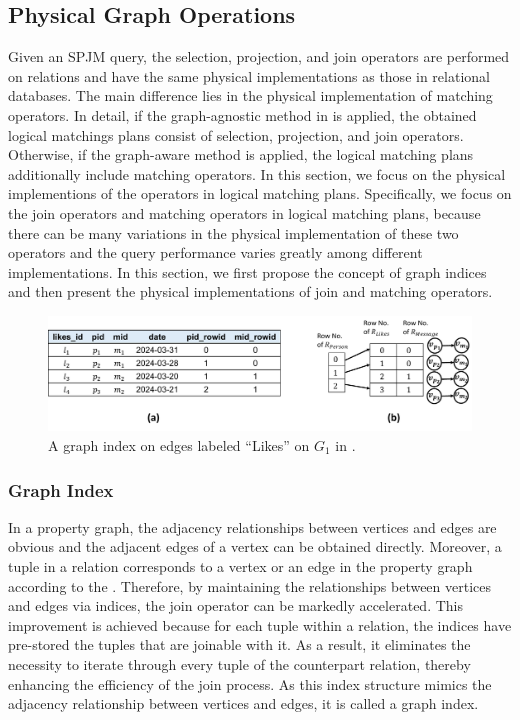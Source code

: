 \subsection{Physical Graph Operations}
\label{sec:physical-operators}

Given an SPJM query, the selection, projection, and join operators are performed on relations and have the same physical implementations as those in relational databases.
The main difference lies in the physical implementation of matching operators.
In detail, if the graph-agnostic method in  is applied, the obtained logical matchings plans consist of selection, projection, and join operators.
Otherwise, if the graph-aware method is applied, the logical matching plans additionally include matching operators.
In this section, we focus on the physical implementions of the operators in logical matching plans.
Specifically, we focus on the join operators and matching operators in logical matching plans, because there can be many variations in the physical implementation of these two operators and the query performance varies greatly among different implementations.
In this section, we first propose the concept of graph indices and then present the physical implementations of join and matching operators.

\begin{figure}
    \centering
    \includegraphics[width=.8\linewidth]{./figures/graph-index-likes.pdf}
    \caption{A graph index on edges labeled ``Likes'' on $G_1$ in .}
    \label{fig:graph-index}
\end{figure}

\subsubsection{Graph Index}
\label{sec:graph-index}

In a property graph, the adjacency relationships between vertices and edges are obvious and the adjacent edges of a vertex can be obtained directly.
Moreover, a tuple in a relation corresponds to a vertex or an edge in the property graph according to the \rgmapping.
Therefore, by maintaining the relationships between vertices and edges via indices, the join operator can be markedly accelerated.
This improvement is achieved because for each tuple within a relation, the indices have pre-stored the tuples that are joinable with it.
As a result, it eliminates the necessity to iterate through every tuple of the counterpart relation, thereby enhancing the efficiency of the join process.
As this index structure mimics the adjacency relationship between vertices and edges, it is called a graph index.

